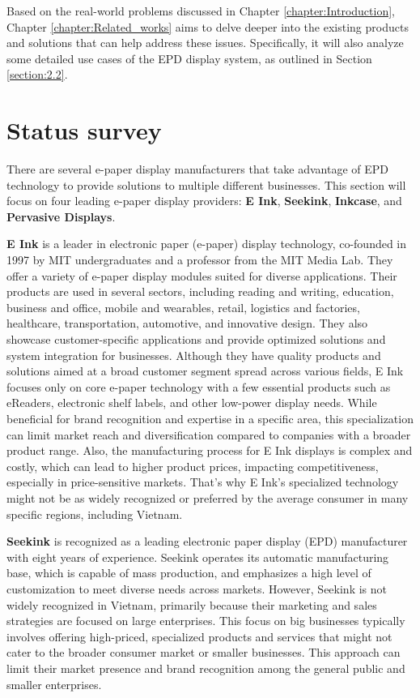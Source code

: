 \documentclass[../Main.tex]{subfiles}
\begin{document}
Based on the real-world problems discussed in Chapter \ref{chapter:Introduction}, Chapter \ref{chapter:Related_works} aims to delve deeper into the existing products and solutions that can help address these issues. Specifically, it will also analyze some detailed use cases of the EPD display system, as outlined in Section \ref{section:2.2}.

\section{Status survey}
\label{section:2.1}
There are several e-paper display manufacturers that take advantage of EPD technology to provide solutions to multiple different businesses. This section will focus on four leading e-paper display providers: \textbf{E Ink}, \textbf{Seekink}, \textbf{Inkcase}, and \textbf{Pervasive Displays}.

\textbf{E Ink} is a leader in electronic paper (e-paper) display technology, co-founded in 1997 by MIT undergraduates and a professor from the MIT Media Lab. They offer a variety of e-paper display modules suited for diverse applications. Their products are used in several sectors, including reading and writing, education, business and office, mobile and wearables, retail, logistics and factories, healthcare, transportation, automotive, and innovative design. They also showcase customer-specific applications and provide optimized solutions and system integration for businesses. Although they have quality products and solutions aimed at a broad customer segment spread across various fields, E Ink focuses only on core e-paper technology with a few essential products such as eReaders, electronic shelf labels, and other low-power display needs. While beneficial for brand recognition and expertise in a specific area, this specialization can limit market reach and diversification compared to companies with a broader product range. Also, the manufacturing process for E Ink displays is complex and costly, which can lead to higher product prices, impacting competitiveness, especially in price-sensitive markets. That's why E Ink's specialized technology might not be as widely recognized or preferred by the average consumer in many specific regions, including Vietnam.

\textbf{Seekink} is recognized as a leading electronic paper display (EPD) manufacturer with eight years of experience. Seekink operates its automatic manufacturing base, which is capable of mass production, and emphasizes a high level of customization to meet diverse needs across markets. However, Seekink is not widely recognized in Vietnam, primarily because their marketing and sales strategies are focused on large enterprises. This focus on big businesses typically involves offering high-priced, specialized products and services that might not cater to the broader consumer market or smaller businesses. This approach can limit their market presence and brand recognition among the general public and smaller enterprises. 
\end{document}
